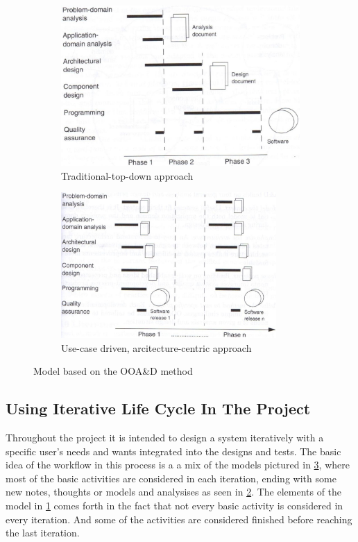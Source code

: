 \begin{figure}[H]
	\centering
	\begin{subfigure}[b]{0.48\textwidth}
		\includegraphics[width=\textwidth]{billeder/SUModel1.jpg}
		\caption{Traditional-top-down approach \citep[p.~16]{Rod-Aalborg}}
		\label{fig:SUModel1}
	\end{subfigure}
	\quad
	\begin{subfigure}[b]{0.48\textwidth}
		\includegraphics[width=0.9\textwidth]{billeder/SUModel2.jpg}
		\caption{Use-case driven, arcitecture-centric approach \citep[p.~17]{Rod-Aalborg}}
		\label{fig:SUModel2}
	\end{subfigure}
	\caption{Model based on the OOA\&D method}\label{fig:SUModels}
\end{figure}

\subsection{Using Iterative Life Cycle In The Project}
Throughout the project it is intended to design a system iteratively with a specific user’s needs and wants integrated into the designs and tests. 
The basic idea of the workflow in this process is a a mix of the models pictured in \cref{fig:SUModels}, where most of the basic activities are considered in each iteration, ending with some new notes, thoughts or models and analysises as seen in \cref{fig:SUModel2}.
The elements of the model in \cref{fig:SUModel1} comes forth in the fact that not every basic activity is considered in every iteration. And some of the activities are considered finished before reaching the last iteration.

